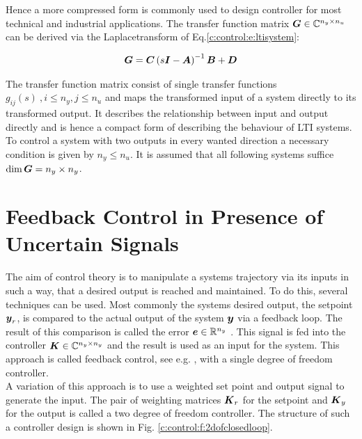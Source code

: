 Hence a more compressed form is commonly used to design controller for most technical and industrial applications. The transfer function matrix \cite[p.20]{Lunze2014} $\mbox{\boldmath$G$} \in \mathbb{C}^{n_y\times n_u}$ can be derived via the Laplacetransform of Eq.\ref{c:control:e:ltisystem}:

\begin{align}
\begin{split}
\mbox{\boldmath$G$} &= \mbox{\boldmath$C$} \left(s \mbox{\boldmath$I$} - \mbox{\boldmath$A$} \right)^{-1} \mbox{\boldmath$B$} + \mbox{\boldmath$D$} \\
\end{split}
\label{c:control:e:TransferFunctionMatrix}
\end{align}

The transfer function matrix consist of single transfer functions $g_{ij}(s)~, i \leq n_y, j \leq n_u$ and maps the transformed input of a system directly to its  transformed output. It describes the relationship between input and output directly and is hence a compact form of describing the behaviour of LTI systems. To control a system with two outputs in every wanted direction a necessary condition is given by $n_y \leq n_u$. It is assumed that all following systems suffice $\dim{\mbox{\boldmath$G$}} = n_y \times n_y$.  \\

\section{Feedback Control in Presence of Uncertain Signals}
\label{c:control:s:feedback}

The aim of control theory is to manipulate a systems trajectory via its inputs in such a way, that a desired output is reached and maintained. To do this, several techniques can be used. Most commonly the systems desired output, the setpoint $\mbox{\boldmath$y$}_r$, is compared to the actual output of the system $\mbox{\boldmath$y$}$ via a feedback loop. The result of this comparison is called the error $\mbox{\boldmath$e$} \in \mathbb{R}^{n_y}$ . This signal is fed into the controller $\mbox{\boldmath$K$} \in \mathbb{C}^{n_y \times n_y}$  and the result is used as an input for the system. This approach is called feedback control, see e.g. \cite{Astrom2009}, with a single degree of freedom controller.\\

A variation of this approach is to use a weighted set point and output signal to generate the input. The pair of weighting matrices $\mbox{\boldmath$K$}_r$  for the setpoint and $\mbox{\boldmath$K$}_y$ for the output is called a two degree of freedom controller. The structure of such a controller design is shown in Fig. \ref{c:control:f:2dofclosedloop}.

